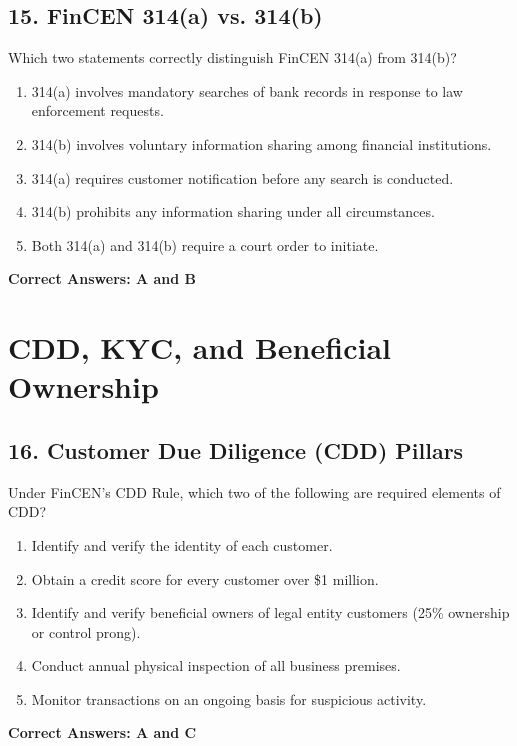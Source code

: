 \documentclass[11pt,a4paper]{article}
\begin{document}
	\subsection{15. FinCEN 314(a) vs. 314(b)}
	Which two statements correctly distinguish FinCEN 314(a) from 314(b)?
	\begin{enumerate}[label=\Alph*.]
		\item 314(a) involves mandatory searches of bank records in response to law enforcement requests.
		\item 314(b) involves voluntary information sharing among financial institutions.
		\item 314(a) requires customer notification before any search is conducted.
		\item 314(b) prohibits any information sharing under all circumstances.
		\item Both 314(a) and 314(b) require a court order to initiate.
	\end{enumerate}
	\textbf{Correct Answers: A and B}
	
	\section{CDD, KYC, and Beneficial Ownership}
	
	\subsection{16. Customer Due Diligence (CDD) Pillars}
	Under FinCEN's CDD Rule, which two of the following are required elements of CDD?
	\begin{enumerate}[label=\Alph*.]
		\item Identify and verify the identity of each customer.
		\item Obtain a credit score for every customer over \$1 million.
		\item Identify and verify beneficial owners of legal entity customers (25\% ownership or control prong).
		\item Conduct annual physical inspection of all business premises.
		\item Monitor transactions on an ongoing basis for suspicious activity.
	\end{enumerate}
	\textbf{Correct Answers: A and C}
	
\end{document}

